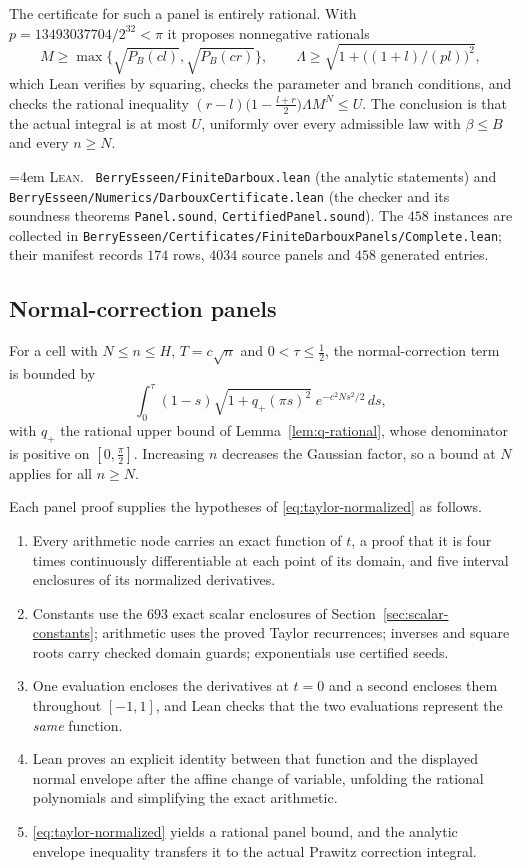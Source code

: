 \documentclass[10pt,a4paper]{article}
\theoremstyle{plain}
\theoremstyle{definition}
\newcommand{\lean}[1]{\texttt{#1}}
\newcommand{\file}[1]{\texttt{#1}}
\newenvironment{leanref}%
  {\par\addvspace{3pt}\begingroup\sloppy\emergencystretch=4em
   \noindent\footnotesize\textsc{Lean.}\ \ignorespaces}%
  {\par\endgroup\addvspace{3pt}}
\begin{document}
The certificate for such a panel is entirely rational. With
$p=13493037704/2^{32}<\pi$ it proposes nonnegative rationals
\[
  M \ge \max\{\sqrt{P_B(cl)},\sqrt{P_B(cr)}\},
  \qquad
  \Lambda \ge \sqrt{1+\bigl((1+l)/(pl)\bigr)^2},
\]
which Lean verifies by squaring, checks the parameter and branch conditions, and
checks the rational inequality
$(r-l)\bigl(1-\tfrac{l+r}{2}\bigr)\Lambda M^N\le U$. The conclusion is that the
actual integral is at most $U$, uniformly over every admissible law with
$\beta\le B$ and every $n\ge N$.

\begin{leanref}
\file{BerryEsseen/FiniteDarboux.lean} (the analytic statements) and
\file{BerryEsseen/Numerics/DarbouxCertificate.lean} (the checker and its
soundness theorems \lean{Panel.sound}, \lean{CertifiedPanel.sound}). The $458$
instances are collected in
\file{BerryEsseen/Certificates/FiniteDarbouxPanels/Complete.lean}; their
manifest records $174$ rows, $4034$ source panels and $458$ generated entries.
\end{leanref}

\subsection{Normal-correction panels}

For a cell with $N\le n\le H$, $T=c\sqrt n$ and $0<\tau\le\tfrac12$, the
normal-correction term is bounded by
\[
  \int_0^\tau (1-s)\sqrt{1+q_+(\pi s)^2}\;e^{-c^2Ns^2/2}\,ds ,
\]
with $q_+$ the rational upper bound of Lemma~\ref{lem:q-rational}, whose
denominator is positive on $[0,\tfrac\pi2]$. Increasing $n$ decreases the
Gaussian factor, so a bound at $N$ applies for all $n\ge N$.

Each panel proof supplies the hypotheses of
\eqref{eq:taylor-normalized} as follows.
\begin{enumerate}[leftmargin=2.2em]
\item Every arithmetic node carries an exact function of $t$, a proof that it is
  four times continuously differentiable at each point of its domain, and five
  interval enclosures of its normalized derivatives.
\item Constants use the $693$ exact scalar enclosures of
  Section~\ref{sec:scalar-constants}; arithmetic uses the proved Taylor
  recurrences; inverses and square roots carry checked domain guards;
  exponentials use certified seeds.
\item One evaluation encloses the derivatives at $t=0$ and a second encloses
  them throughout $[-1,1]$, and Lean checks that the two evaluations represent
  the \emph{same} function.
\item Lean proves an explicit identity between that function and the displayed
  normal envelope after the affine change of variable, unfolding the rational
  polynomials and simplifying the exact arithmetic.
\item \eqref{eq:taylor-normalized} yields a rational panel bound, and the
  analytic envelope inequality transfers it to the actual Prawitz correction
  integral.
\end{enumerate}
\end{document}
